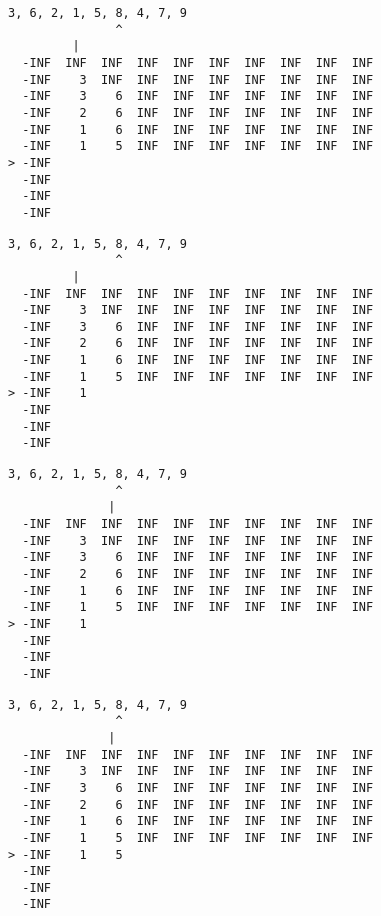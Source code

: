 { \begin{verbatim}
3, 6, 2, 1, 5, 8, 4, 7, 9
               ^
         |
  -INF  INF  INF  INF  INF  INF  INF  INF  INF  INF
  -INF    3  INF  INF  INF  INF  INF  INF  INF  INF
  -INF    3    6  INF  INF  INF  INF  INF  INF  INF
  -INF    2    6  INF  INF  INF  INF  INF  INF  INF
  -INF    1    6  INF  INF  INF  INF  INF  INF  INF
  -INF    1    5  INF  INF  INF  INF  INF  INF  INF
> -INF                                             
  -INF                                             
  -INF                                             
  -INF                                             
\end{verbatim} }

{ \begin{verbatim}
3, 6, 2, 1, 5, 8, 4, 7, 9
               ^
         |
  -INF  INF  INF  INF  INF  INF  INF  INF  INF  INF
  -INF    3  INF  INF  INF  INF  INF  INF  INF  INF
  -INF    3    6  INF  INF  INF  INF  INF  INF  INF
  -INF    2    6  INF  INF  INF  INF  INF  INF  INF
  -INF    1    6  INF  INF  INF  INF  INF  INF  INF
  -INF    1    5  INF  INF  INF  INF  INF  INF  INF
> -INF    1                                        
  -INF                                             
  -INF                                             
  -INF                                             
\end{verbatim} }

{ \begin{verbatim}
3, 6, 2, 1, 5, 8, 4, 7, 9
               ^
              |
  -INF  INF  INF  INF  INF  INF  INF  INF  INF  INF
  -INF    3  INF  INF  INF  INF  INF  INF  INF  INF
  -INF    3    6  INF  INF  INF  INF  INF  INF  INF
  -INF    2    6  INF  INF  INF  INF  INF  INF  INF
  -INF    1    6  INF  INF  INF  INF  INF  INF  INF
  -INF    1    5  INF  INF  INF  INF  INF  INF  INF
> -INF    1                                        
  -INF                                             
  -INF                                             
  -INF                                             
\end{verbatim} }

{ \begin{verbatim}
3, 6, 2, 1, 5, 8, 4, 7, 9
               ^
              |
  -INF  INF  INF  INF  INF  INF  INF  INF  INF  INF
  -INF    3  INF  INF  INF  INF  INF  INF  INF  INF
  -INF    3    6  INF  INF  INF  INF  INF  INF  INF
  -INF    2    6  INF  INF  INF  INF  INF  INF  INF
  -INF    1    6  INF  INF  INF  INF  INF  INF  INF
  -INF    1    5  INF  INF  INF  INF  INF  INF  INF
> -INF    1    5                                   
  -INF                                             
  -INF                                             
  -INF                                             
\end{verbatim} }

